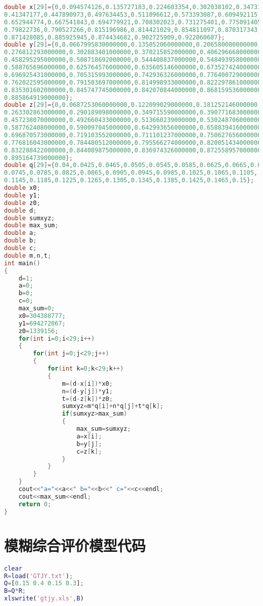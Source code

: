 \documentclass{cumcmthesis}
\begin{document}
\begin{appendices}
\begin{lstlisting}[language=c++]
double x[29]={0,0.094574126,0.135727183,0.224603354,0.302038102,0.347315668,
0.41347177,0.447890973,0.497634453,0.511096612,0.573393087,0.609492115,
0.652944774,0.667541843,0.694779921,0.708302023,0.731275401,0.775091405,
0.79822736,0.790527266,0.815196986,0.814421029,0.854811097,0.870317343,
0.871428085,0.885925945,0.874434682,0.902725909,0.922060687};
double y[29]={0,0.0667995830000000,0.135052060000000,0.206580080000000,
0.276812293000000,0.302883401000000,0.370215852000000,0.406296668000000,
0.458295295000000,0.508718692000000,0.544408837000000,0.548493958000000,
0.588765696000000,0.625764576000000,0.635605146000000,0.673527424000000,
0.696925431000000,0.705315993000000,0.742936326000000,0.776400729000000,
0.762022595000000,0.791503697000000,0.814998933000000,0.822297861000000,
0.835301602000000,0.845747745000000,0.842070844000000,0.868159536000000,
0.885864919000000};
double z[29]={0,0.0687253060000000,0.122099029000000,0.181252146000000,
0.263302863000000,0.290189098000000,0.349715590000000,0.390771683000000,
0.457238070000000,0.492660433000000,0.513660239000000,0.530248706000000,
0.587762408000000,0.590097045000000,0.642993656000000,0.658839416000000,
0.696870573000000,0.719103552000000,0.711101237000000,0.750627656000000,
0.776816043000000,0.784480512000000,0.795566274000000,0.820051434000000,
0.832288422000000,0.844089875000000,0.836974326000000,0.872558957000000,
0.895164739000000};
double q[29]={0.04,0.0425,0.0465,0.0505,0.0545,0.0585,0.0625,0.0665,0.0705,
0.0745,0.0785,0.0825,0.0865,0.0905,0.0945,0.0985,0.1025,0.1065,0.1105,
0.1145,0.1185,0.1225,0.1265,0.1305,0.1345,0.1385,0.1425,0.1465,0.15};
double x0;
double y1;
double z0;
double d;
double sumxyz;
double max_sum;
double a;
double b;
double c;
double m,n,t;
int main()
{
	d=1;
	a=0;
	b=0;
	c=0;
	max_sum=0;
	x0=304388777;
	y1=694272067;
	z0=1339156;
	for(int i=0;i<29;i++)
	{
		for(int j=0;j<29;j++)
		{
			for(int k=0;k<29;k++)
			{
				m=(d-x[i])*x0;
				n=(d-y[j])*y1;
				t=(d-z[k])*z0;
				sumxyz=m*q[i]+n*q[j]+t*q[k];
				if(sumxyz>max_sum)
				{
					max_sum=sumxyz;
					a=x[i];
					b=y[j];
					c=z[k];
				}
			}
		}	
	}
	cout<<"a="<<a<<" b="<<b<<" c="<<c<<endl;
	cout<<max_sum<<endl;
	return 0;
}
\end{lstlisting}

\section{模糊综合评价模型代码}
\begin{lstlisting}[language=matlab]
clear
R=load('GTJY.txt');
Q=[0.15 0.4 0.15 0.3];
B=Q*R;
xlswrite('gtjy.xls',B)
\end{lstlisting}


\end{appendices}
\end{document}
